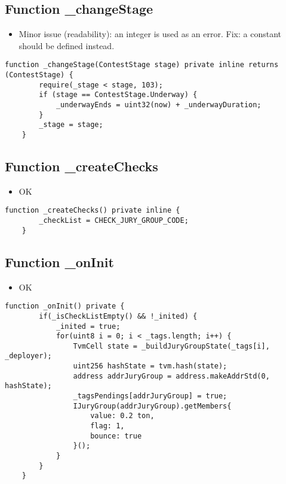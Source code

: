 \subsection{Function \_{}changeStage}

\begin{itemize}
\item Minor issue (readability): an integer is used as an error. Fix:
  a constant should be defined instead.
\end{itemize}

\begin{lstlisting}[firstnumber=106]
    function _changeStage(ContestStage stage) private inline returns (ContestStage) {
        require(_stage < stage, 103);
        if (stage == ContestStage.Underway) {
            _underwayEnds = uint32(now) + _underwayDuration;
        }
        _stage = stage;
    }
\end{lstlisting}

\subsection{Function \_{}createChecks}

\begin{itemize}
\item OK
\end{itemize}

\begin{lstlisting}[firstnumber=17]
    function _createChecks() private inline {
        _checkList = CHECK_JURY_GROUP_CODE;
    }
\end{lstlisting}

\subsection{Function \_{}onInit}

\begin{itemize}
\item OK
\end{itemize}

\begin{lstlisting}[firstnumber=47]
    function _onInit() private {
        if(_isCheckListEmpty() && !_inited) {
            _inited = true;
            for(uint8 i = 0; i < _tags.length; i++) {
                TvmCell state = _buildJuryGroupState(_tags[i], _deployer);
                uint256 hashState = tvm.hash(state);
                address addrJuryGroup = address.makeAddrStd(0, hashState);
                _tagsPendings[addrJuryGroup] = true;
                IJuryGroup(addrJuryGroup).getMembers{
                    value: 0.2 ton,
                    flag: 1,
                    bounce: true
                }();
            }
        }
    }
\end{lstlisting}
